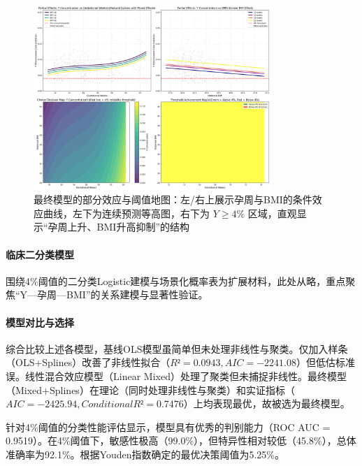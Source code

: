 \documentclass[withoutpreface]{cumcmthesis}
\begin{document}
\begin{figure}[htbp]
\centering
\includegraphics[width=0.8\textwidth]{output/figures/p1_comprehensive_partial_effects.png}
\caption{最终模型的部分效应与阈值地图：左/右上展示孕周与BMI的条件效应曲线，左下为连续预测等高图，右下为 $Y\ge4\%$ 区域，直观显示“孕周上升、BMI升高抑制”的结构}
\label{fig:final_partial_effects}
\end{figure}




\paragraph{临床二分类模型}
围绕4\%阈值的二分类Logistic建模与场景化概率表为扩展材料，此处从略，重点聚焦“Y—孕周—BMI”的关系建模与显著性验证。

\paragraph{模型对比与选择}

综合比较上述各模型，基线OLS模型虽简单但未处理非线性与聚类。仅加入样条（OLS+Splines）改善了非线性拟合（$R²=0.0943, AIC=-2241.08$）但低估标准误。线性混合效应模型（Linear Mixed）处理了聚类但未捕捉非线性。最终模型（Mixed+Splines）在理论（同时处理非线性与聚类）和实证指标（$AIC=-2425.94, Conditional R²=0.7476$）上均表现最优，故被选为最终模型。

针对4\%阈值的分类性能评估显示，模型具有优秀的判别能力（ROC AUC = 0.9519）。在4\%阈值下，敏感性极高（99.0\%），但特异性相对较低（45.8\%），总体准确率为92.1\%。根据Youden指数确定的最优决策阈值为5.25\%。

\end{document}
